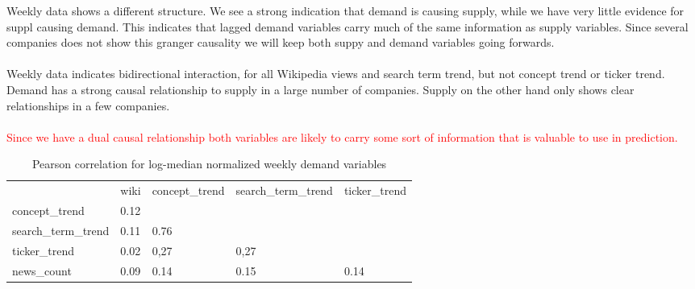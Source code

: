 Weekly data shows a different structure. We see a strong indication that demand is causing supply, while we have very little evidence for suppl causing demand. This indicates that lagged demand variables carry much of the same information as supply variables. Since several companies does not show this granger causality we will keep both suppy and demand variables going forwards. 
\\\\
Weekly data indicates bidirectional interaction, for all Wikipedia views and search term trend, but not concept trend or ticker trend. Demand has a strong causal relationship to supply in a large number of companies. Supply on the other hand only shows clear relationships in a few companies.  
\\\\
\textcolor{red}{Since we have a dual causal relationship both variables are likely to carry some sort of information that is valuable to use in prediction. }

\clearpage

\begin{table}[]
\caption{Pearson correlation for log-median normalized weekly demand variables} \label{tab:inf_demand_cor_weekly} 
\centering
\begin{tabular}{lllll}
\hline
 & wiki & concept\_trend & search\_term\_trend & ticker\_trend \\
concept\_trend & 0.12 &  & &  &  \\
search\_term\_trend & 0.11 & 0.76 &  & & \\
ticker\_trend & 0.02 & 0,27 & 0,27 &  &  \\
news\_count & 0.09 & 0.14 & 0.15 & 0.14 & \\ \hline

\end{tabular}%

\end{table}

\begin{table}[]
\caption{Granger causality for log-median normalized weekly data} \label{tab:gr_caus_weekly}
\centering
{}
\end{table}

\cleardoublepage
